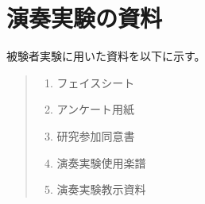 \documentclass[11pt,a4j,dvipdfmx]{jreport}
\begin{document}
\chapter{演奏実験の資料}
  被験者実験に用いた資料を以下に示す。
  \begin{quote}
    \begin{enumerate}
      \item フェイスシート
      \item アンケート用紙
      \item 研究参加同意書
      \item 演奏実験使用楽譜
      \item 演奏実験教示資料
    \end{enumerate}
  \end{quote}
  \clearpage

  
  \clearpage

  
  \clearpage

  
  \clearpage

  
  \clearpage

  
  \clearpage


\end{document}
